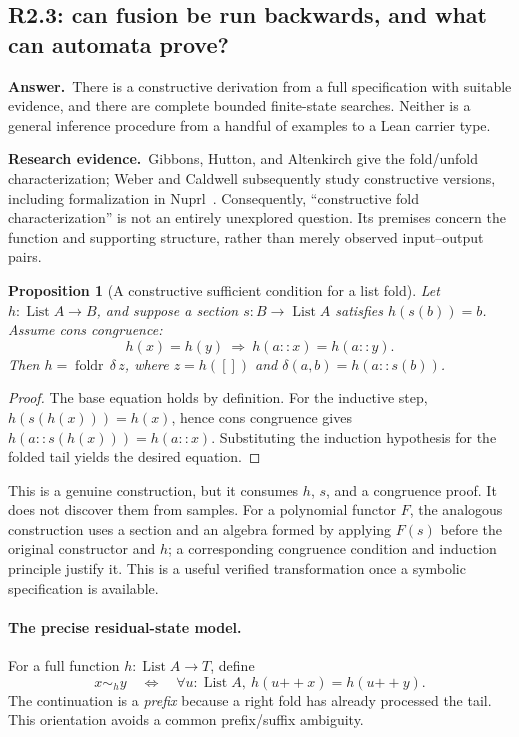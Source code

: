 \documentclass[11pt,a4paper]{article}
\newtheorem{proposition}{Proposition}[section]
\theoremstyle{definition}
\theoremstyle{remark}
\newcommand{\List}{\operatorname{List}}
\newcommand{\foldr}{\operatorname{foldr}}
\newcommand{\concat}{\mathbin{+\!+}}
\newcommand{\ans}{\noindent\textbf{Answer.}\ }
\newcommand{\lit}{\par\noindent\textbf{Research evidence.}\ }
\begin{document}
\subsection{R2.3: can fusion be run backwards, and what can automata prove?}\label{q:R2.3}
\ans There is a constructive derivation from a full specification with suitable
evidence, and there are complete bounded finite-state searches. Neither is a
general inference procedure from a handful of examples to a Lean carrier type.

\lit Gibbons, Hutton, and Altenkirch give the fold/unfold characterization;
Weber and Caldwell subsequently study constructive versions, including
formalization in Nuprl~\cite{fold-characterization,constructive-fold}.
Consequently, ``constructive fold characterization'' is not an entirely
unexplored question. Its premises concern the function and supporting
structure, rather than merely observed input--output pairs.

\begin{proposition}[A constructive sufficient condition for a list fold]
Let $h:\List A\to B$, and suppose a section $s:B\to\List A$ satisfies
$h(s(b))=b$. Assume cons congruence:
\[
 h(x)=h(y)\ \Longrightarrow\ h(a::x)=h(a::y).
\]
Then $h=\foldr\,\delta\,z$, where
$z=h([])$ and $\delta(a,b)=h(a::s(b))$.
\end{proposition}
\begin{proof}
The base equation holds by definition. For the inductive step,
$h(s(h(x)))=h(x)$, hence cons congruence gives
$h(a::s(h(x)))=h(a::x)$. Substituting the induction hypothesis for the folded
tail yields the desired equation.
\end{proof}

This is a genuine construction, but it consumes $h$, $s$, and a congruence
proof. It does not discover them from samples. For a polynomial functor $F$,
the analogous construction uses a section and an algebra formed by applying
$F(s)$ before the original constructor and $h$; a corresponding congruence
condition and induction principle justify it. This is a useful verified
transformation once a symbolic specification is available.

\paragraph{The precise residual-state model.}
For a full function $h:\List A\to T$, define
\begin{equation}\label{eq:residual}
 x\sim_h y\quad\Longleftrightarrow\quad
 \forall u:\List A,\ h(u\concat x)=h(u\concat y).
\end{equation}
The continuation is a \emph{prefix} because a right fold has already processed
the tail. This orientation avoids a common prefix/suffix ambiguity.
\end{document}
